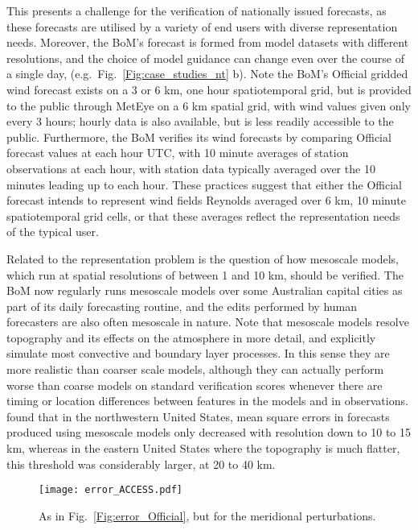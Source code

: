 \documentclass{article}
\begin{document}
This presents a challenge for the verification of nationally issued forecasts, as these forecasts are utilised by a variety of end users with diverse representation needs. Moreover, the BoM's forecast is formed from model datasets with different resolutions, and the choice of model guidance can change even over the course of a single day, (e.g.~Fig.~\ref{Fig:case_studies_nt} b). Note the BoM's Official gridded wind forecast exists on a 3 or 6 km, one hour spatiotemporal grid, but is provided to the public through MetEye \citep{bomMetEye19} on a 6 km spatial grid, with wind values given only every 3 hours; hourly data is also available, but is less readily accessible to the public. Furthermore, the BoM verifies its wind forecasts by comparing Official forecast values at each hour UTC, with 10 minute averages of station observations at each hour, with station data typically averaged over the 10 minutes leading up to each hour. These practices suggest that either the Official forecast intends to represent wind fields Reynolds averaged over 6 km, 10 minute spatiotemporal grid cells, or that these averages reflect the representation needs of the typical user. 

Related to the representation problem is the question of how mesoscale models, which run at spatial resolutions of between 1 and 10 km, should be verified. The BoM now regularly runs mesoscale models over some Australian capital cities as part of its daily forecasting routine, and the edits performed by human forecasters are also often mesoscale in nature. Note that mesoscale models resolve topography and its effects on the atmosphere in more detail, and explicitly simulate most convective and boundary layer processes. In this sense they are more realistic than coarser scale models, although they can actually perform worse than coarse models on standard verification scores whenever there are timing or location differences between features in the models and in observations. \citet{mass02} found that in the northwestern United States, mean square errors in forecasts produced using mesoscale models only decreased with resolution down to 10 to 15 km, whereas in the eastern United States where the topography is much flatter, this threshold was considerably larger, at 20 to 40 km. 

\begin{figure*}
\centering
\texttt{[image: error\_ACCESS.pdf]}
\caption{As in Fig.~\ref{Fig:error_Official}, but for the meridional perturbations.}
\label{Fig:error_ACCESS}
\end{figure*}
\end{document}
